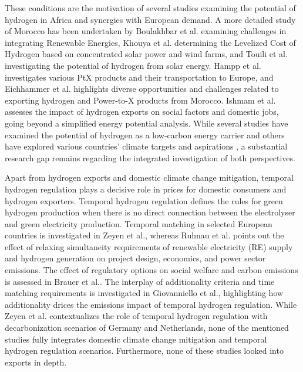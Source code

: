 These conditions are the motivation of several studies \cite{vanWijk2021, AbouSeada2022, vanderZwaan2021, Schellekens2010, Cavana2021, Touili2022, Timmerberg2019a, Sens2022, Franzmann2023} examining the potential of hydrogen in Africa and synergies with European demand. A more detailed study of Morocco has been undertaken by Boulakhbar et al.\cite{Boulakhbar2020} examining challenges in integrating Renewable Energies, Khouya et al.\cite{Khouya2020} determining the Levelized Cost of Hydrogen based on concentrated solar power and wind farms, and Touili et al.\cite{Touili2018} investigating the potential of hydrogen from solar energy. Hampp et al.\cite{Hampp2023} investigates various PtX products and their transportation to Europe, and Eichhammer et al. \cite{Eichhammer2019} highlights diverse opportunities and challenges related to exporting hydrogen and Power-to-X products from Morocco. Ishmam et al. \cite{Ishmam2024} assesses the impact of hydrogen exports on social factors and domestic jobs, going beyond a simplified energy potential analysis.
While several studies \cite{Hampp2023, AbouSeada2022, vanWijk2021} have examined the potential of hydrogen as a low-carbon energy carrier and others have explored various countries' climate targets and aspirations \cite{Boulakhbar2020}, a substantial research gap remains regarding the integrated investigation of both perspectives. 


Apart from hydrogen exports and domestic climate change mitigation, temporal hydrogen regulation plays a decisive role in prices for domestic consumers and hydrogen exporters. 
Temporal hydrogen regulation defines the rules for green hydrogen production when there is no direct connection between the electrolyser and green electricity production.
Temporal matching in selected European countries is investigated in Zeyen et al.\cite{Zeyen2024}, whereas Ruhnau et al.\cite{Ruhnau2023a} points out the effect of relaxing simultaneity requirements of renewable electricity (RE) supply and hydrogen generation on project design, economics, and power sector emissions.
The effect of regulatory options on social welfare and carbon emissions is assessed in Brauer et al.\cite{Brauer2022}. The interplay of additionality criteria and time matching requirements is investigated in Giovanniello et al.\cite{Giovanniello2024}, highlighting how additionality drices the emissions impact of temporal hydrogen regulation.
While Zeyen et al.\cite{Zeyen2024} contextualizes the role of temporal hydrogen regulation with decarbonization scenarios of Germany and Netherlands, none of the mentioned studies fully integrates domestic climate change mitigation and temporal hydrogen regulation scenarios. Furthermore, none of these studies looked into exports in depth.

